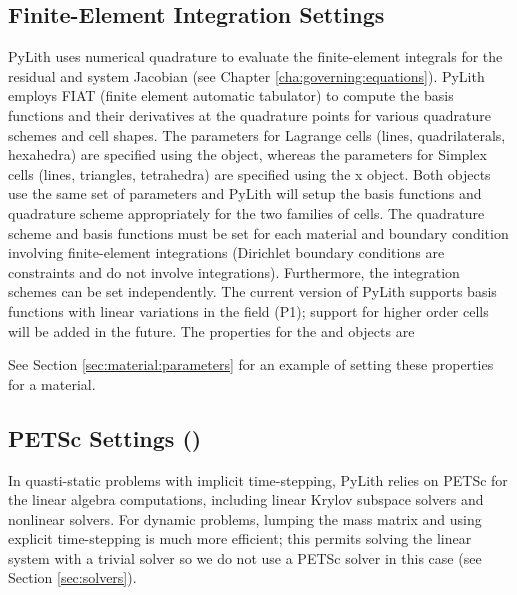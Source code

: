 \subsection{Finite-Element Integration Settings}

PyLith uses numerical quadrature to evaluate the finite-element
integrals for the residual and system Jacobian (see Chapter
\vref{cha:governing:equations}).  PyLith employs FIAT (finite element
automatic tabulator) to compute the basis functions and their
derivatives at the quadrature points for various quadrature schemes
and cell shapes. The parameters for Lagrange cells (lines,
quadrilaterals, hexahedra) are specified using the
 object, whereas the parameters for Simplex cells
(lines, triangles, tetrahedra) are specified using the
x object. Both objects use the same set of
parameters and PyLith will setup the basis functions and quadrature
scheme appropriately for the two families of cells. The quadrature
scheme and basis functions must be set for each material and boundary
condition involving finite-element integrations (Dirichlet boundary
conditions are constraints and do not involve
integrations). Furthermore, the integration schemes can be set
independently. The current version of PyLith supports basis functions
with linear variations in the field (P1); support for higher order
cells will be added in the future. The properties for the
 and  objects are
\begin{inventory}
\end{inventory}
See Section \vref{sec:material:parameters} for an example of setting
these properties for a material.


\subsection{PETSc Settings ()}
\label{sec:petsc:options}

In quasti-static problems with implicit time-stepping, PyLith relies
on PETSc for the linear algebra computations, including linear Krylov
subspace solvers and nonlinear solvers. For dynamic problems, lumping
the mass matrix and using explicit time-stepping is much more efficient;
this permits solving the linear system with a trivial solver so we
do not use a PETSc solver in this case (see Section \vref{sec:solvers}).

